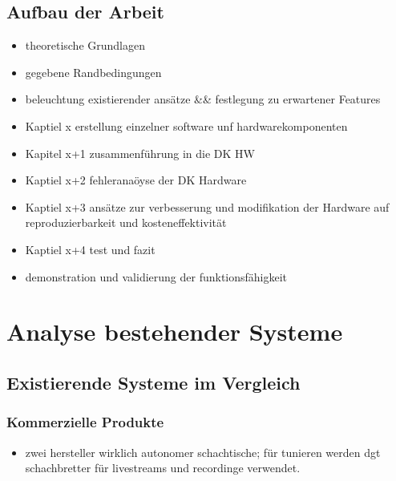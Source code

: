 \hypertarget{aufbau-der-arbeit}{%
\subsection{Aufbau der Arbeit}\label{aufbau-der-arbeit}}

\begin{itemize}
\item
  theoretische Grundlagen
\item
  gegebene Randbedingungen
\item
  beleuchtung existierender ansätze \&\& festlegung zu erwartener
  Features
\item
  Kaptiel x erstellung einzelner software unf hardwarekomponenten
\item
  Kapitel x+1 zusammenführung in die DK HW
\item
  Kaptiel x+2 fehleranaöyse der DK Hardware
\item
  Kaptiel x+3 ansätze zur verbesserung und modifikation der Hardware auf
  reproduzierbarkeit und kosteneffektivität
\item
  Kaptiel x+4 test und fazit
\item
  demonstration und validierung der funktionsfähigkeit
\end{itemize}

\hypertarget{analyse-bestehender-systeme}{%
\section{Analyse bestehender
Systeme}\label{analyse-bestehender-systeme}}

\hypertarget{existierende-systeme-im-vergleich}{%
\subsection{Existierende Systeme im
Vergleich}\label{existierende-systeme-im-vergleich}}

\hypertarget{kommerzielle-produkte}{%
\subsubsection{Kommerzielle Produkte}\label{kommerzielle-produkte}}

\begin{itemize}
\tightlist
\item
  zwei hersteller wirklich autonomer schachtische; für tunieren werden
  dgt schachbretter für livestreams und recordinge verwendet.
\end{itemize}

